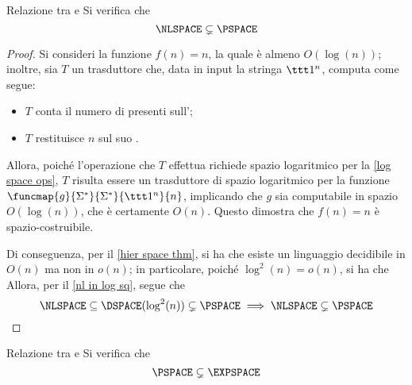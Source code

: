 \documentclass[a4paper, 12pt]{report}
\begin{document}
    \begin{framedprop}{Relazione tra \NLSPACE e \PSPACE}
        Si verifica che $$\NLSPACE \subsetneq \PSPACE$$
    \end{framedprop}

    \begin{proof}
        Si consideri la funzione $f(n) = n$, la quale è almeno $O(\log(n))$; inoltre, sia $T$ un trasduttore che, data in input la stringa $\ttt 1^n$, computa come segue:

        \begin{itemize}
            \item $T$ conta il numero di  presenti sull';
            \item $T$ restituisce $n$ sul suo .
        \end{itemize}

        Allora, poiché l'operazione che $T$ effettua richiede spazio logaritmico per la \cref{log space ops}, $T$ risulta essere un trasduttore di spazio logaritmico per la funzione $\funcmap{g}{\Sigma^*}{\Sigma^*}{\ttt 1^n}{n}$, implicando che $g$ sia computabile in spazio $O(\log(n))$, che è certamente $O(n)$. Questo dimostra che $f(n) = n$ è spazio-costruibile.

        Di conseguenza, per il \cref{hier space thm}, si ha che esiste un linguaggio decidibile in $O(n)$ ma non in $o(n)$; in particolare, poiché $\log^2(n) = o(n)$, si ha che  Allora, per il \cref{nl in log sq}, segue che $$\NLSPACE \subseteq \DSPACE(\log^2(n)) \subsetneq \PSPACE \implies \NLSPACE \subsetneq \PSPACE$$
    \end{proof}

    \begin{framedprop}[label={pspace in expspace}]{Relazione tra \PSPACE e \EXPSPACE}
        Si verifica che $$\PSPACE \subsetneq \EXPSPACE$$
    \end{framedprop}
\end{document}
